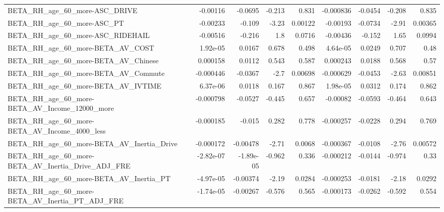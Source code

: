\begin{tabular}{lrrrrrrrr}
BETA\_RH\_age\_60\_more-ASC\_DRIVE                      &    -0.00116 &      -0.0695 &   -0.213 &    0.831 &  -0.000836 &     -0.0454 &       -0.208 &         0.835 \\
BETA\_RH\_age\_60\_more-ASC\_PT                         &    -0.00233 &       -0.109 &    -3.23 &  0.00122 &   -0.00193 &     -0.0734 &        -2.91 &       0.00365 \\
BETA\_RH\_age\_60\_more-ASC\_RIDEHAIL                   &    -0.00516 &       -0.216 &      1.8 &   0.0716 &   -0.00436 &      -0.152 &         1.65 &        0.0994 \\
BETA\_RH\_age\_60\_more-BETA\_AV\_COST                   &    1.92e-05 &       0.0167 &    0.678 &    0.498 &   4.64e-05 &      0.0249 &        0.707 &          0.48 \\
BETA\_RH\_age\_60\_more-BETA\_AV\_Chinese                &    0.000158 &       0.0112 &    0.543 &    0.587 &   0.000243 &      0.0188 &        0.568 &          0.57 \\
BETA\_RH\_age\_60\_more-BETA\_AV\_Commute                &   -0.000446 &      -0.0367 &     -2.7 &  0.00698 &  -0.000629 &     -0.0453 &        -2.63 &       0.00851 \\
BETA\_RH\_age\_60\_more-BETA\_AV\_IVTIME                 &    6.37e-06 &       0.0118 &    0.167 &    0.867 &   1.98e-05 &      0.0312 &        0.174 &         0.862 \\
BETA\_RH\_age\_60\_more-BETA\_AV\_Income\_12000\_more      &   -0.000798 &      -0.0527 &   -0.445 &    0.657 &   -0.00082 &     -0.0593 &       -0.464 &         0.643 \\
BETA\_RH\_age\_60\_more-BETA\_AV\_Income\_4000\_less       &   -0.000185 &       -0.015 &    0.282 &    0.778 &  -0.000257 &     -0.0228 &        0.294 &         0.769 \\
BETA\_RH\_age\_60\_more-BETA\_AV\_Inertia\_Drive          &   -0.000172 &     -0.00478 &    -2.71 &   0.0068 &  -0.000367 &     -0.0108 &        -2.76 &       0.00572 \\
BETA\_RH\_age\_60\_more-BETA\_AV\_Inertia\_Drive\_ADJ\_FRE  &   -2.82e-07 &    -1.89e-05 &   -0.962 &    0.336 &  -0.000212 &     -0.0144 &       -0.974 &          0.33 \\
BETA\_RH\_age\_60\_more-BETA\_AV\_Inertia\_PT             &   -4.97e-05 &     -0.00374 &    -2.19 &   0.0284 &  -0.000253 &     -0.0181 &        -2.18 &        0.0292 \\
BETA\_RH\_age\_60\_more-BETA\_AV\_Inertia\_PT\_ADJ\_FRE     &   -1.74e-05 &     -0.00267 &   -0.576 &    0.565 &  -0.000173 &     -0.0262 &       -0.592 &         0.554 \\

\end{tabular}
